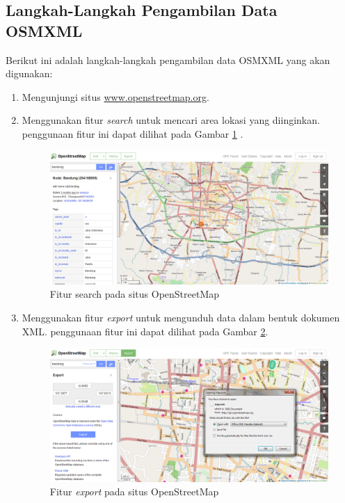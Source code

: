 \subsection{Langkah-Langkah Pengambilan Data OSMXML}
Berikut ini adalah langkah-langkah pengambilan data OSMXML yang akan digunakan:
\begin{enumerate}
  \item Mengunjungi situs \url{www.openstreetmap.org}.
  
  \item Menggunakan fitur \textit{search} untuk mencari area lokasi yang
  diinginkan. penggunaan fitur ini dapat dilihat pada Gambar
  \ref{fig:osmsearch_analisis} .
\begin{figure}[h]
\centering
\includegraphics[scale=0.4]{Gambar/osmsearch_analisis}
\caption[Fitur search pada situs OpenStreetMap]{Fitur search pada situs
OpenStreetMap}
\label{fig:osmsearch_analisis}
\end{figure}
  
  \item Menggunakan fitur \textit{export} untuk mengunduh data dalam
  bentuk dokumen XML. penggunaan fitur ini dapat dilihat pada Gambar
  \ref{fig:osmxml_analisis}.
\begin{figure}[h]
\centering
\includegraphics[scale=0.4]{Gambar/osmxml_analisis}
\caption[Fitur search pada situs OpenStreetMap]{Fitur \textit{export} pada situs
OpenStreetMap}
\label{fig:osmxml_analisis}
\end{figure}
\end{enumerate}

